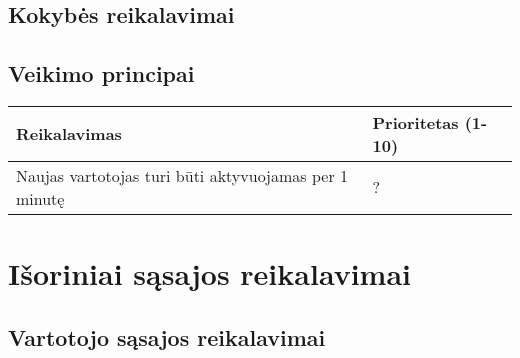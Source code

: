 \documentclass[oneside]{VUMIFPSkursinis}
\begin{document}
\subsection{Kokybės reikalavimai}

\subsection{Veikimo principai}

\begin{table}[htbp]
	\begin{tabularx}{1\textwidth}{ |X|P{3cm }| }
       	          \hline
           	Reikalavimas &  Prioritetas (1-10)  \\   \hline 
        		Naujas vartotojas turi būti aktyvuojamas per 1 minutę  &  ?  \\   \hline
	\end{tabularx}
\end{table}

\section{Išoriniai sąsajos reikalavimai}
\subsection{Vartotojo sąsajos reikalavimai}
\end{document}
